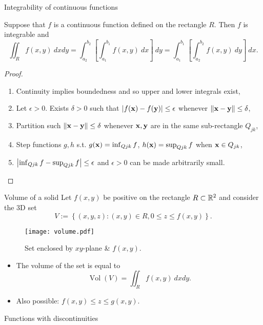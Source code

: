 {Integrability of continuous functions}

\begin{theorem}
    Suppose that \(f\) is a continuous function defined on the rectangle \(R\).
    Then \(f\) is integrable and
    \[
        \iint_{R} f(x,y) \ dxdy
        = \int_{a_2}^{b_2} \left[ \int_{a_1}^{b_1} f(x,y) \ dx  \right] \ dy
        = \int_{a_1}^{b_1} \left[\int_{a_2}^{b_2}  f(x,y) \ dy  \right] \ dx.
    \]
\end{theorem}
\begin{proof}
    \begin{enumerate}
        \item Continuity implies boundedness and so upper and lower integrals exist,
        \item Let \(\epsilon>0\). Exists \(\delta>0\) such that \(\left|f(\mathbf{x})-f(\mathbf{y})\right|\leq \epsilon\) whenever \(\left\|\mathbf{x}-\mathbf{y}\right\|\leq \delta\),
        \item Partition such  \(\left\|\mathbf{x}-\mathbf{y}\right\|\leq \delta\) whenever \(\mathbf{x},\mathbf{y}\) are in the same sub-rectangle \(Q_{jk}\),
        \item Step functions \(g,h\) s.t. \(g(\mathbf{x})=\inf_{Q{jk}} f\),   \(h(\mathbf{x})=\sup_{Q{jk}} f\) when \(\mathbf{x}\in Q_{jk}\),
        \item \(\left|\inf_{Q{jk}} f - \sup_{Q{jk}} f \right|\leq \epsilon\) and \(\epsilon>0\) can be made arbitrarily small.
    \end{enumerate}
\end{proof}


{Volume of a solid}
Let \(f(x,y)\) be positive on the rectangle \(R \subset \mathbb{R}^2\) and consider the 3D set
\[
    V := \left\{(x,y,z): (x,y)\in R, 0 \leq z \leq f(x,y)\right\}.
\]


\begin{figure}
    \centering
    \texttt{[image: volume.pdf]}
    \caption{Set enclosed by \(xy\)-plane \& \(f(x,y)\).}
\end{figure}

\begin{itemize}
    \item  The volume of the set is equal to
          \[
              \operatorname{Vol}(V) = \iint_{R} f(x,y) \ dxdy.
          \]
    \item Also possible: \(f(x,y)\leq z \leq g(x,y)\).
\end{itemize}



{Functions with discontinuities}

